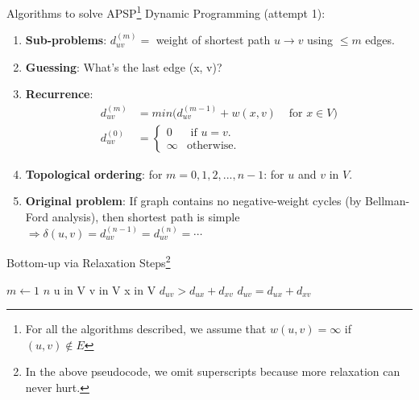 \documentclass[aspectratio=169]{beamer}
\begin{document}
\begin{frame}{Algorithms to solve APSP\footnote{\scriptsize For all the algorithms described, we assume that $w(u, v) = \infty$ if $(u, v) \notin E$}}
    Dynamic Programming (attempt 1):
    \begin{enumerate}
    \scriptsize
        \item \textbf{Sub-problems}: $d_{uv}^{(m)} =$ weight of shortest path $u \rightarrow v$ using $\leq m$ edges. \pause
        \item \textbf{Guessing}: What's the last edge (x, v)? \pause
        \item \textbf{Recurrence}:
        \begin{equation*}
            \begin{align*}
                d_{uv}^{(m)} &= min( d_{uv}^{(m - 1)} + w(x, v) & \text{ for } x \in V) \\
                d_{uv}^{(0)} &=
                    \begin{cases}
                        0 & \text{ if } u = v. \\
                        \infty & \text{otherwise}.
                    \end{cases}
            \end{align*}
        \end{equation*} \pause
        \item \textbf{Topological ordering}: for $m = 0, 1, 2, . . . , n - 1$: for $u$ and $v$ in $V$. \pause
        \item \textbf{Original problem}: If graph contains no negative-weight cycles (by Bellman-Ford analysis), then shortest path is simple $\Rightarrow \delta(u, v) = d_{uv}^{(n - 1)} = d_{uv}^{(n)} = \cdots$
    \end{enumerate}
\end{frame}

\begin{frame}{Bottom-up via Relaxation Steps\footnote{{\scriptsize In the above pseudocode, we omit superscripts because more relaxation can never hurt.}}}
    \begin{codebox}
        \li \For $m \gets 1$ \To $n$ 
        \li \hspace{0.5cm} \For u in V
        \li \hspace{1.0cm} \For v in V
        \li \hspace{1.5cm} \For x in V
        \li \hspace{2.0cm} \If $d_{uv} > d_{ux} + d_{xv}$
        \li \hspace{2.5cm} $d_{uv} = d_{ux} + d_{xv}$
    \end{codebox}
\end{frame}
\end{document}
